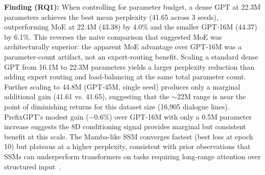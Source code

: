 \documentclass[11pt]{article}
\begin{document}
\begin{table}[t]
\centering
\caption{From-scratch SLM validation perplexity (20 epochs, 3 seeds). \textbf{Bold}: best mean. GPT-22M is param-matched to MoE at $\sim$22M.}
\label{tab:slm}
\small
{}
\end{table}

\textbf{Finding (RQ1):} When controlling for parameter budget, a dense GPT at 22.3M parameters achieves the best mean perplexity (41.65 across 3 seeds), outperforming MoE at 22.4M (43.38) by 4.0\% and the smaller GPT-16M (44.37) by 6.1\%.
This reverses the naive comparison that suggested MoE was architecturally superior: the apparent MoE advantage over GPT-16M was a parameter-count artifact, not an expert-routing benefit.
Scaling a standard dense GPT from 16.1M to 22.3M parameters yields a larger perplexity reduction than adding expert routing and load-balancing at the same total parameter count.
Further scaling to 44.8M (GPT-45M, single seed) produces only a marginal additional gain (41.61 vs. 41.65), suggesting that the $\sim$22M range is near the point of diminishing returns for this dataset size (16,905 dialogue lines).
PrefixGPT's modest gain ($-0.6\%$) over GPT-16M with only a 0.5M parameter increase suggests the 8D conditioning signal provides marginal but consistent benefit at this scale.
The Mamba-like SSM converges fastest (best loss at epoch 10) but plateaus at a higher perplexity, consistent with prior observations that SSMs can underperform transformers on tasks requiring long-range attention over structured input~\cite{gu2023mamba}.
\end{document}
